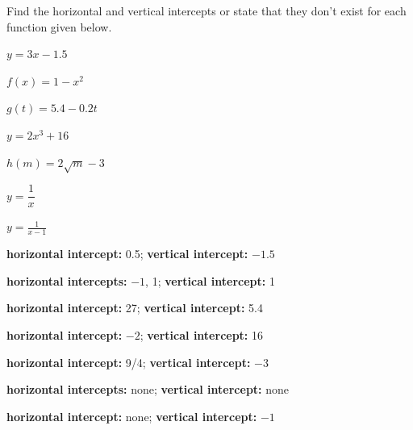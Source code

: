 
\begin{exercise}
Find the horizontal and vertical intercepts or state that they don't exist for each function given below.


\begin{parts}

\item $y=3x-1.5$

\item $f(x)=1-x^2$

\item $g(t)=5.4-0.2t$

\item $y=2x^3+16$

\item $h(m)=2\sqrt{m}-3$

\item $ y=\dfrac{1}{x}$

\item $\displaystyle y=\frac{1}{x-1}$

\end{parts}

\end{exercise}


\begin{solution}
    \begin{parts}
        \item {\bf horizontal intercept:} 0.5; {\bf vertical intercept:} $-1.5$
        \item {\bf horizontal intercepts:} $-1$, 1; {\bf vertical intercept:} 1
        \item {\bf horizontal intercept:} 27; {\bf vertical intercept:} 5.4
        \item {\bf horizontal intercept:} $-2$; {\bf vertical intercept:} 16
        \item {\bf horizontal intercept:} 9/4; {\bf vertical intercept:} $-3$
        \item {\bf horizontal intercepts:} none; {\bf vertical intercept:} none
        \item {\bf horizontal intercept:} none; {\bf vertical intercept:} $-1$
    \end{parts}
\end{solution}






